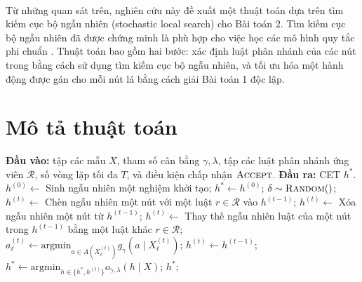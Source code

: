 \paragraph{} Từ những quan sát trên, nghiên cứu này đề xuất một thuật toán dựa trên tìm kiếm cục bộ ngẫu nhiên (stochastic local search) cho Bài toán 2. Tìm kiếm cục bộ ngẫu nhiên đã được chứng minh là phù hợp cho việc học các mô hình quy tắc phi chuẩn \parencite{wang2019gainingfreelowcosttransparency, pan2020interpretablecompanionsblackboxmodels}. Thuật toán bao gồm hai bước: xác định luật phân nhánh của các nút trong bằng cách sử dụng tìm kiếm cục bộ ngẫu nhiên, và tối ưu hóa một hành động được gán cho mỗi nút lá bằng cách giải Bài toán 1 độc lập.

\section{Mô tả thuật toán}

\begin{algorithm}[H]
\caption{Tìm kiếm cục bộ ngẫu nhiên cho CET}
\begin{algorithmic}[1]
\Statex \hspace*{-\algorithmicindent}\textbf{Đầu vào:} tập các mẫu $X$, tham số cân bằng $\gamma, \lambda$, tập các luật phân nhánh ứng viên $\mathcal{R}$, số vòng lặp tối đa $T$, và điều kiện chấp nhận $\textsc{Accept}$.
\Statex \hspace*{-\algorithmicindent}\textbf{Đầu ra:} CET $h^*$.
\State $h^{(0)} \gets$ Sinh ngẫu nhiên một nghiệm khởi tạo;
\State $h^* \gets h^{(0)}$;
    \State $\delta \sim \textsc{Random}()$;
        \State $h^{(t)} \gets$ Chèn ngẫu nhiên một nút với một luật $r \in \mathcal{R}$ vào $h^{(t-1)}$;
        \State $h^{(t)} \gets$ Xóa ngẫu nhiên một nút từ $h^{(t-1)}$;
    \Else
        \State $h^{(t)} \gets$ Thay thế ngẫu nhiên luật của một nút trong $h^{(t-1)}$ bằng một luật khác $r \in \mathcal{R}$;
    \EndIf
        \State $a_\ell^{(t)} \gets \displaystyle \text{argmin}_{a \in A(X_\ell^{(t)})} g_\gamma\!\left(a \mid X_\ell^{(t)}\right)$;
    \EndFor
        \State $h^{(t)} \gets h^{(t-1)}$;
    \EndIf
    \State $h^* \gets \text{argmin}_{h \in \{h^*,h^{(t)}\}} o_{\gamma,\lambda}(h \mid X)$;
\EndFor
\State \Return $h^*$;
\end{algorithmic}
\end{algorithm}


